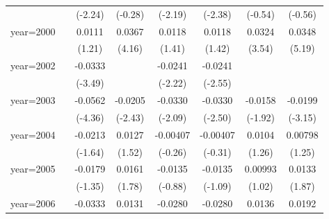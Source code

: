 \begin{table}[htbp]
\begin{tabular}{l*{7}{c}}
                    &                     &     (-2.24)         &     (-0.28)         &     (-2.19)         &     (-2.38)         &     (-0.54)         &     (-0.56)         \\
\addlinespace
year=2000           &                     &      0.0111         &      0.0367\sym{***}&      0.0118         &      0.0118         &      0.0324\sym{***}&      0.0348\sym{***}\\
                    &                     &      (1.21)         &      (4.16)         &      (1.41)         &      (1.42)         &      (3.54)         &      (5.19)         \\
\addlinespace
year=2002           &                     &     -0.0333\sym{***}&                     &     -0.0241\sym{*}  &     -0.0241\sym{*}  &                     &                     \\
                    &                     &     (-3.49)         &                     &     (-2.22)         &     (-2.55)         &                     &                     \\
\addlinespace
year=2003           &                     &     -0.0562\sym{***}&     -0.0205\sym{*}  &     -0.0330\sym{*}  &     -0.0330\sym{*}  &     -0.0158         &     -0.0199\sym{**} \\
                    &                     &     (-4.36)         &     (-2.43)         &     (-2.09)         &     (-2.50)         &     (-1.92)         &     (-3.15)         \\
\addlinespace
year=2004           &                     &     -0.0213         &      0.0127         &    -0.00407         &    -0.00407         &      0.0104         &     0.00798         \\
                    &                     &     (-1.64)         &      (1.52)         &     (-0.26)         &     (-0.31)         &      (1.26)         &      (1.25)         \\
\addlinespace
year=2005           &                     &     -0.0179         &      0.0161         &     -0.0135         &     -0.0135         &     0.00993         &      0.0133         \\
                    &                     &     (-1.35)         &      (1.78)         &     (-0.88)         &     (-1.09)         &      (1.02)         &      (1.87)         \\
\addlinespace
year=2006           &                     &     -0.0333\sym{**} &      0.0131         &     -0.0280\sym{*}  &     -0.0280\sym{*}  &      0.0136         &      0.0192\sym{**} \\

\end{tabular}
\end{table}
